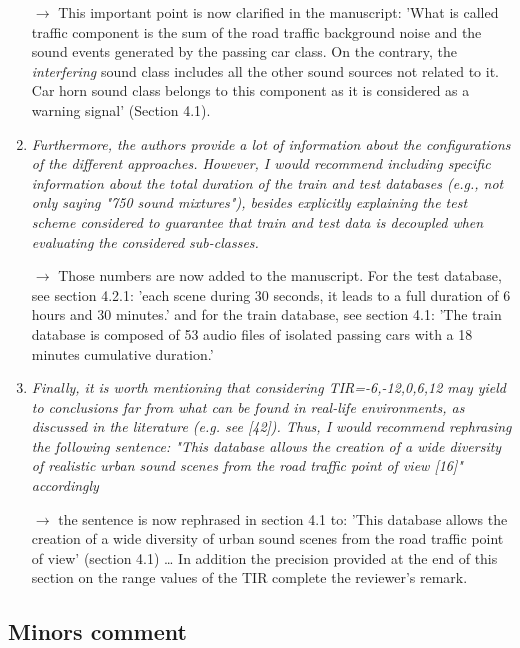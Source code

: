 \documentclass[10pt]{article}
\begin{document}
\begin{enumerate}
$\rightarrow$ This important point is now clarified in the manuscript: 'What is called traffic component is the sum of the road traffic background noise and the sound events generated by the passing car class. On the contrary, the \textit{interfering} sound class includes all the other sound sources not related to it. Car horn sound class belongs to this component as it is considered as a warning signal' (Section 4.1).


\item \emph{Furthermore, the authors provide a lot of information about the configurations of the different approaches. However, I would recommend including specific information about the total duration of the train and test databases (e.g., not only saying "750 sound mixtures"), besides explicitly explaining the test scheme considered to guarantee that train and test data is decoupled when evaluating the considered sub-classes.}

$\rightarrow$ Those numbers are now added to the manuscript. For the test database, see section 4.2.1: 'each scene during 30 seconds, it leads to a full duration of 6 hours and 30 minutes.' and for the train database, see section 4.1: 'The train database is composed of 53 audio files of isolated passing cars with a 18 minutes cumulative duration.'

\item \emph{Finally, it is worth mentioning that considering TIR={-6,-12,0,6,12} may yield to conclusions far from what can be found in real-life environments, as discussed in the literature (e.g. see [42]). Thus, I would recommend rephrasing the following sentence: "This database allows the creation of a wide diversity of realistic urban sound scenes from the road traffic point of view [16]" accordingly}

$\rightarrow$ the sentence is now rephrased in section 4.1 to: 'This database allows the creation of a wide diversity of urban sound scenes from the road traffic point of view' (section 4.1) \dots 
In addition the precision provided at the end of this section on the range values of the TIR complete the reviewer's remark.

\end{enumerate}

\subsection{Minors comment}
\end{document}
